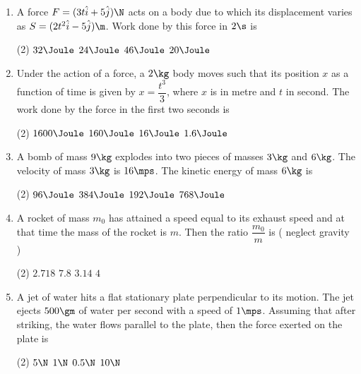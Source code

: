 \documentclass{article}
\newcommand{\ans}{\textcolor{red!95}{\textit{\quad}}}
\begin{document}
\begin{enumerate}
\item A force $F=(3t\hat{i}+5\hat{j})\N$ acts on a body due to which its displacement varies as $S=(2t^2\hat{i}-5\hat{j})\m$. Work done by this force in $2\s$ is
\begin{tasks}(2)
	\task $32\Joule$
	\task $24\Joule$\ans
	\task $46\Joule$
	\task $20\Joule$
\end{tasks}

\item Under the action of a force, a $2 \kg$ body moves such that its position $x$ as a function of time is given by $x=\dfrac{t^3}{3}$, where $x$ is in metre and $t$ in second. The work done by the force in the first two seconds is
\begin{tasks}(2)
	\task $1600\Joule$
	\task $160\Joule$
	\task $16\Joule$\ans
	\task $1.6\Joule$
\end{tasks}

\item A bomb of mass $9 \kg$ explodes into two pieces of masses $3 \kg$ and $6 \kg$. The velocity of mass $3 \kg$ is $16\mps$. The kinetic energy of mass $6 \kg$ is
\begin{center}
\end{center}
\begin{tasks}(2)
	\task $96\Joule$
	\task $384\Joule$
	\task $192\Joule$\ans
	\task $768\Joule$
\end{tasks}


\item A rocket of mass $m_0$ has attained a speed equal to its exhaust speed and at that time the mass of
the rocket is $m$. Then the ratio $\dfrac{m_0}{m}$ is ( neglect gravity )
\begin{tasks}(2)
	\task $2.718$\ans
	\task $7.8$
	\task $3.14$
	\task $4$
\end{tasks}

\item A jet of water hits a flat stationary plate perpendicular to its motion. The jet ejects $500\gm$ of water per second with a speed of $1 \mps$. Assuming that after striking, the water flows parallel to the plate, then the force exerted on the plate is
\begin{tasks}(2)
	\task $5\N$
	\task $1\N$
	\task $0.5\N$\ans
	\task $10\N$
\end{tasks}


\end{enumerate}
\end{document}
